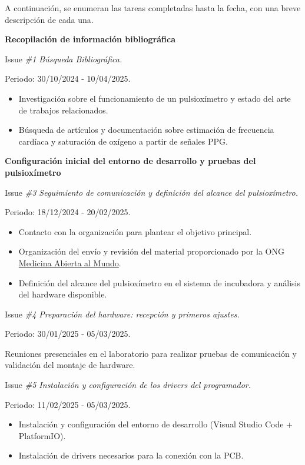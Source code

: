 A continuación, se enumeran las tareas completadas hasta la fecha, con una breve descripción de cada una. 
\vspace{0.3cm}

\textbf{Recopilación de información bibliográfica}

Issue \textit{\#1 Búsqueda Bibliográfica.}

Periodo: 30/10/2024 - 10/04/2025.


\begin{itemize}
    \item Investigación sobre el funcionamiento de un pulsioxímetro y estado del arte de trabajos relacionados.
    \item Búsqueda de artículos y documentación sobre estimación de frecuencia cardíaca y saturación de oxígeno a partir de señales PPG.
\end{itemize}

\textbf{Configuración inicial del entorno de desarrollo y pruebas del pulsioxímetro}

Issue \textit{\#3 Seguimiento de comunicación y definición del alcance del pulsioxímetro.}

Periodo: 18/12/2024 - 20/02/2025.

\begin{itemize}
    \item Contacto con la organización para plantear el objetivo principal.
    \item Organización del envío y revisión del material proporcionado por la ONG \href{https://medicalopenworld.org/}{Medicina Abierta al Mundo}.
    \item Definición del alcance del pulsioxímetro en el sistema de incubadora y análisis del hardware disponible.
\end{itemize}

Issue \textit{\#4 Preparación del hardware: recepción y primeros ajustes.}

Periodo: 30/01/2025 - 05/03/2025.

Reuniones presenciales en el laboratorio para realizar pruebas de comunicación y validación del montaje de hardware.

\vspace{0.3cm}

Issue \textit{\#5 Instalación y configuración de los drivers del programador.}

Periodo: 11/02/2025 - 05/03/2025.

\begin{itemize}
    \item Instalación y configuración del entorno de desarrollo (Visual Studio Code + PlatformIO).
    \item Instalación de drivers necesarios para la conexión con la PCB.
\end{itemize}


